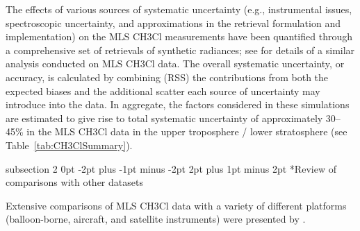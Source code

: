 \documentclass[11pt,draft]{report}
\makeatletter
\renewcommand{\subsection}{\@startsection%
  {subsection}%
  {2}%
  {0pt}%
  {-2pt plus -1pt minus -2pt}%
  {2pt plus 1pt minus 2pt}%
  {\large\sffamily\fontseries{sb}\selectfont\flushleft\color{SectionColor}\figureversion{tabular}}}%
\makeatother
\begin{document}
The effects of various sources of systematic uncertainty (e.g.,
instrumental issues, spectroscopic uncertainty, and approximations in
the retrieval formulation and implementation) on the MLS \thisv CH\cs3Cl
measurements have been quantified through a comprehensive set of
retrievals of synthetic radiances; see \citet{SanteeEtal13} for details
of a similar analysis conducted on MLS \prevv CH\cs3Cl data.  The
overall systematic uncertainty, or accuracy, is calculated by combining
(RSS) the contributions from both the expected biases and the additional
scatter each source of uncertainty may introduce into the data.  In
aggregate, the factors considered in these simulations are estimated to
give rise to total systematic uncertainty of approximately 30--45\% in
the MLS \thisv CH\cs3Cl data in the upper troposphere / lower
stratosphere (see Table~\ref{tab:CH3ClSummary}).

\subsection*{Review of comparisons with other datasets}

Extensive comparisons of MLS \prevv CH\cs3Cl data with a variety of
different platforms (balloon-borne, aircraft, and satellite instruments)
were presented by \citet{SanteeEtal13}.
\end{document}
